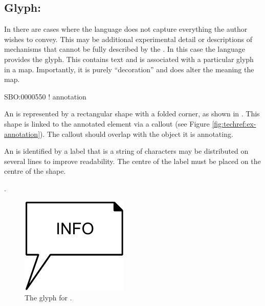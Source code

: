 \subsection{Glyph: }
\label{sec:annotation}

In \SBGNPDLone there are cases where the language does not capture everything the author wishes to convey.
This may be additional experimental detail or descriptions of mechanisms that cannot be fully described by the \PDl.
In this case the language provides the  glyph. This contains text and is associated with a particular glyph in a map.
Importantly, it is purely ``decoration'' and does alter the meaning the map.

\begin{glyphDescription}

\glyphSboTerm
SBO:0000550 ! annotation



\glyphContainer
An  is represented by a rectangular shape with a folded corner, as shown in .
This shape is linked to the annotated element via a callout (see Figure \ref{fig:techref:ex-annotation}).
The callout should overlap with the object it is annotating.

\glyphLabel
An  is identified by a label that is  a string of characters  may be distributed on several lines to improve readability.
The centre of the label must be placed on the centre of the shape.

\glyphAux
{}.

\end{glyphDescription}

\begin{figure}[htb]
  \centering
  \includegraphics{images/annotation}
  \caption{The \PD glyph for .}
  \label{fig:techref:annotation}
\end{figure}

